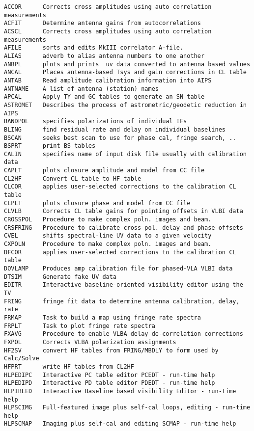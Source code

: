 \vskip 0.5pt
\bbve\begin{verbatim}
ACCOR      Corrects cross amplitudes using auto correlation measurements
ACFIT      Determine antenna gains from autocorrelations
ACSCL      Corrects cross amplitudes using auto correlation measurements
AFILE      sorts and edits MkIII correlator A-file.
ALIAS      adverb to alias antenna numbers to one another
ANBPL      plots and prints  uv data converted to antenna based values
ANCAL      Places antenna-based Tsys and gain corrections in CL table
ANTAB      Read amplitude calibration information into AIPS
ANTNAME    A list of antenna (station) names
APCAL      Apply TY and GC tables to generate an SN table
ASTROMET   Describes the process of astrometric/geodetic reduction in AIPS
BANDPOL    specifies polarizations of individual IFs
BLING      find residual rate and delay on individual baselines
BSCAN      seeks best scan to use for phase cal, fringe search, ..
BSPRT      print BS tables
CALIN      specifies name of input disk file usually with calibration data
CAPLT      plots closure amplitude and model from CC file
CL2HF      Convert CL table to HF table
CLCOR      applies user-selected corrections to the calibration CL table
CLPLT      plots closure phase and model from CC file
CLVLB      Corrects CL table gains for pointing offsets in VLBI data
CROSSPOL   Procedure to make complex poln. images and beam.
CRSFRING   Procedure to calibrate cross pol. delay and phase offsets
CVEL       shifts spectral-line UV data to a given velocity
CXPOLN     Procedure to make complex poln. images and beam.
DFCOR      applies user-selected corrections to the calibration CL table
DOVLAMP    Produces amp calibration file for phased-VLA VLBI data
DTSIM      Generate fake UV data
EDITR      Interactive baseline-oriented visibility editor using the TV
FRING      fringe fit data to determine antenna calibration, delay, rate
FRMAP      Task to build a map using fringe rate spectra
FRPLT      Task to plot fringe rate spectra
FXAVG      Procedure to enable VLBA delay de-correlation corrections
FXPOL      Corrects VLBA polarization assignments
HF2SV      convert HF tables from FRING/MBDLY to form used by Calc/Solve
HFPRT      write HF tables from CL2HF
HLPEDIPC   Interactive PC table editor PCEDT - run-time help
HLPEDIPD   Interactive PD table editor PDEDT - run-time help
HLPIBLED   Interactive Baseline based visibility Editor - run-time help
HLPSCIMG   Full-featured image plus self-cal loops, editing - run-time help
HLPSCMAP   Imaging plus self-cal and editing SCMAP - run-time help

\end{verbatim}
